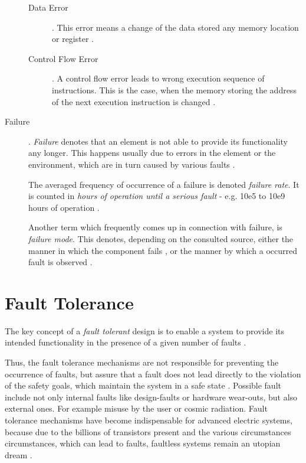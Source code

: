 \begin{description}
	\begin{description}
	\item [Data Error] .
	This error means a change of the data stored any memory location or register \cite{elattar2007}.

	\item [Control Flow Error] .
	A control flow error leads to wrong execution sequence of instructions. This is the case, when the memory storing the address of the next execution instruction is changed \cite{elattar2007}.
	\end{description}

\item [Failure] .
\emph{Failure} denotes that an element is not able to provide its functionality any longer. This happens usually due to errors in the element or the environment, which are in turn caused by various faults \cite{iso26262:1} \cite{nelson} \cite{autosar_glossary}.

The averaged frequency of occurrence of a failure is denoted \emph{failure rate}. It is counted in \emph{hours of operation until a serious fault} - e.g. 10e5 to 10e9 hours of operation \cite{rodrigues2011}.

Another term which frequently comes up in connection with failure, is \emph{failure mode}. This denotes, depending on the consulted source, either the manner in which the component fails \cite{international2006analysis}, or the manner by which a occurred fault is observed \cite{mil1980}.
\end{description}




\section{Fault Tolerance}
\label{ch:fault_tolerance}

The key concept of a \emph{fault tolerant} design is to enable a system to provide its intended functionality in the presence of a given number of faults \cite{nelson}.

Thus, the fault tolerance mechanisms are not responsible for preventing the occurrence of faults, but assure that a fault does not lead directly to the violation of the safety goals, which maintain the system in a safe state \cite{iso26262:1}. Possible fault include not only internal faults like design-faults or hardware wear-outs, but also external ones. For example misuse by the user or cosmic radiation. Fault tolerance mechanisms have become indispensable for advanced electric systems, because due to the billions of transistors present and the various circumstances circumstances, which can lead to faults, faultless systems remain an utopian dream \cite{genesys}.



